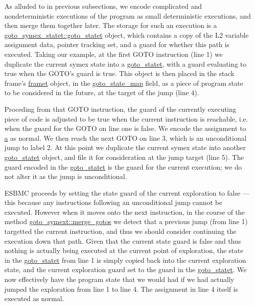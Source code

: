 \documentclass{article}
\begin{document}
As alluded to in previous subsections, we encode complicated and
nondeterministic executions of the program as small deterministic executions,
and then merge them together later. The storage for such an execution is a
\url{goto_symex_statet::goto_statet} object, which contains a copy of
the L2 variable assignment data, pointer tracking set, and a guard for whether
this path is executed.  Taking our example, at the first GOTO instruction (line
1) we duplicate the current symex state into a \url{goto_statet}, with a
guard evaluating to true when the GOTO's guard is true. This object is then
placed in the stack frame's \url{framet} object, in the
\url{goto_state_map} field, as a piece of program state to be considered
in the future, at the target of the jump (line 4).

Proceding from that GOTO instruction, the guard of the currently executing
piece of code is adjusted to be true when the current instruction is reachable,
i.e. when the guard for the GOTO on line one is false.
We encode the assignment to \url{a} as normal. We then reach the next
GOTO on line 3, which is an unconditional jump to label 2. At this point we
duplicate the current symex state into another \url{goto_statet} object,
and file it for consideration at the jump target (line 5). The guard encoded
in the \url{goto_statet} is the guard for the current execution; we do not
alter it as the jump is unconditional.

ESBMC proceeds by setting the state guard of the current exploration to
false --- this because any instructions following an unconditional jump cannot
be executed. However when it moves onto the next instruction, in the course
of the method \url{goto_symext::merge_gotos} we detect that a previous
jump (from line 1) targetted the current instruction, and thus we should
consider continuing the execution down that path. Given that the current state
guard is false and thus nothing is actually being executed at the current
point of exploration, the state in the \url{goto_statet} from line 1 is
simply copied back into the current exploration state, and the current
exploration guard set to the guard in the \url{goto_statet}. We now
effectively have the program state that we would had if we had actually
jumped the exploration from line 1 to line 4. The assignment in line 4 itself
is executed as normal.
\end{document}
